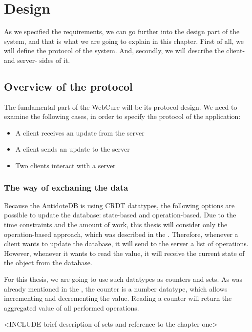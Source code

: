 \chapter{Design}
\label{Design}

As we specified the requirements, we can go further into the design part of the system, and that is what we are going to explain in this chapter. 
First of all, we will define the protocol of the system. And, secondly, we will describe the client- and server- sides of it.

\section{Overview of the protocol}

The fundamental part of the WebCure will be its protocol design. We need to examine the following cases, in order to specify the protocol of the application:

    \begin{itemize}
        \item {A client receives an update from the server}
        \item {A client sends an update to the server}
        \item {Two clients interact with a server}
    \end{itemize}

\subsection{The way of exchaning the data}

Because the AntidoteDB is using CRDT datatypes, the following options are possible to update the database: state-based and operation-based. Due to the time constraints and the amount of work, this thesis will consider only the operation-based approach, which was described in the . Therefore, whenever a client wants to update the database, it will send to the server a list of operations. However, whenever it wants to read the value, it will receive the current state of the object from the database.

For this thesis, we are going to use such datatypes as counters and sets. As was already mentioned in the , the counter is a number datatype, which allows incrementing and decrementing the value. Reading a counter will return the aggregated value of all performed operations.  

<INCLUDE brief description of sets and reference to the chapter one>



